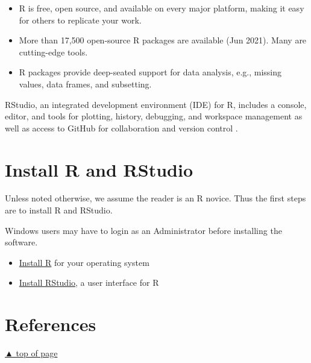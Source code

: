 \documentclass[
]{book}
\providecommand{\tightlist}{%
  \setlength{\itemsep}{0pt}\setlength{\parskip}{0pt}}
\newlength{\cslhangindent}
\newlength{\cslentryspacingunit} %
\newenvironment{CSLReferences}[2] %
 {%
  \setlength{\parindent}{0pt}
  \ifodd #1
  \let\oldpar\par
  \def\par{\hangindent=\cslhangindent\oldpar}
  \fi
  \setlength{\parskip}{#2\cslentryspacingunit}
 }%
 {}
\begin{document}
\begin{itemize}
\tightlist
\item
  R is free, open source, and available on every major platform, making it easy for others to replicate your work.
\item
  More than 17,500 open-source R packages are available (Jun 2021). Many are cutting-edge tools.
\item
  R packages provide deep-seated support for data analysis, e.g., missing values, data frames, and subsetting.
\end{itemize}

RStudio, an integrated development environment (IDE) for R, includes a console, editor, and tools for plotting, history, debugging, and workspace management as well as access to GitHub for collaboration and version control \citep{2016rstudio}.

\hypertarget{install-R-and-RStudio}{%
\section*{Install R and RStudio}\label{install-R-and-RStudio}}

Unless noted otherwise, we assume the reader is an R novice. Thus the first steps are to install R and RStudio.

Windows users may have to login as an Administrator before installing the software.

\begin{itemize}
\tightlist
\item
  \href{https://cloud.r-project.org}{Install R} for your operating system\\
\item
  \href{https://www.rstudio.com/products/rstudio/\#Desktop}{Install RStudio}, a user interface for R
\end{itemize}

\hypertarget{references}{%
\section*{References}\label{references}}

\hypertarget{refs}{}
\begin{CSLReferences}{0}{0}
\end{CSLReferences}

\protect\hyperlink{get-start-r}{▲ top of page}

  
\end{document}
